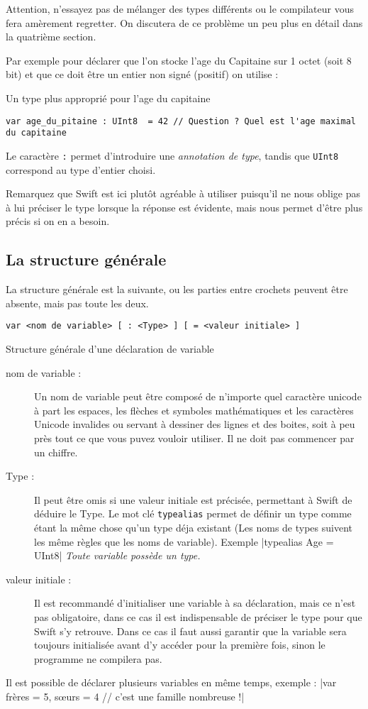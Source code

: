 Attention, n'essayez pas de mélanger des types différents ou le compilateur vous fera amèrement regretter. On discutera de ce problème un peu plus en détail dans la quatrième section.

Par exemple pour déclarer que l'on stocke l'age du Capitaine sur 1 octet (soit 8 bit) et que ce doit être un entier non signé (positif) on utilise :

\begin{listing}[h]
\caption{Un type plus approprié pour l'age du capitaine}
\begin{verbatim}
var age_du_pitaine : UInt8  = 42 // Question ? Quel est l'age maximal du capitaine
\end{verbatim}
\end{listing}
Le caractère \verb":" permet d'introduire une \emph{annotation de type}, tandis que \verb"UInt8" correspond au type d'entier choisi.

Remarquez que Swift est ici plutôt agréable à utiliser puisqu'il ne nous oblige pas à lui préciser le type lorsque la réponse est évidente, mais nous permet d'être plus précis si on en a besoin.
\subsection{La structure générale}
La structure générale est la suivante, ou les parties entre crochets peuvent être absente, mais pas toute les deux.
\begin{listing}[h]
\begin{verbatim}
var <nom de variable> [ : <Type> ] [ = <valeur initiale> ]
\end{verbatim}
\caption{Structure générale d'une déclaration de variable}
\end{listing}
\begin{description}
\item[nom de variable :] Un nom de variable peut être composé de n'importe quel caractère unicode à part les espaces, les flèches et symboles mathématiques et les caractères Unicode invalides ou servant à dessiner des lignes et des boites, soit à peu près tout ce que vous puvez vouloir utiliser. Il ne doit pas commencer par un chiffre.
\item[Type :] Il peut être omis si une valeur initiale est précisée, permettant à Swift de déduire le Type.
Le mot clé \texttt{typealias} permet de définir un type comme étant la même chose qu'un type déja existant (Les noms de types suivent les même règles que les noms de variable). Exemple |typealias Age = UInt8|
\emph{Toute variable possède un type.}
\item[valeur initiale :] Il est recommandé d'initialiser une variable à sa déclaration, mais ce n'est pas obligatoire, dans ce cas il est indispensable de préciser le type pour que Swift s'y retrouve. Dans ce cas il faut aussi garantir que la variable sera toujours initialisée avant d'y accéder pour la première fois, sinon le programme ne compilera pas.
\end{description}
Il est possible de déclarer plusieurs variables en même temps, exemple :
|var frères = 5, sœurs = 4 // c'est une famille nombreuse !|
